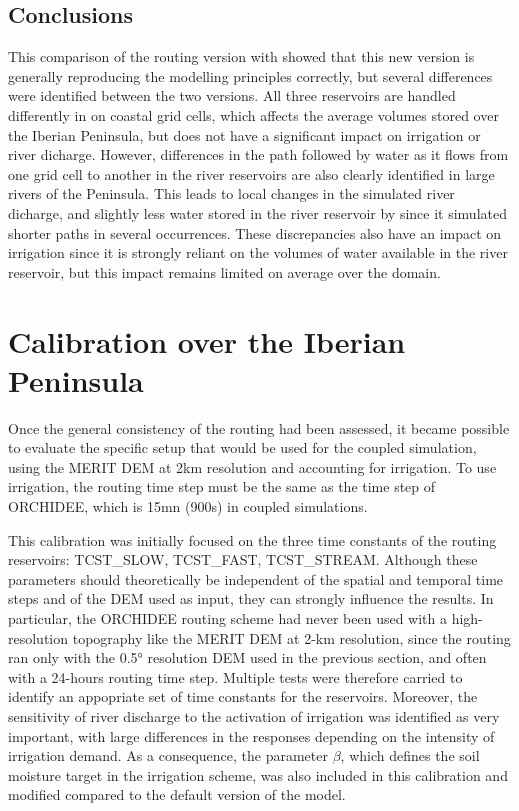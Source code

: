 \subsection{Conclusions}

This comparison of the \native routing version with \std showed that this new version is generally reproducing the modelling principles correctly, but several differences were identified between the two versions. All three reservoirs are handled differently in \native on coastal grid cells, which affects the average volumes stored over the Iberian Peninsula, but does not have a significant impact on irrigation or river dicharge. However, differences in the path followed by water as it flows from one grid cell to another in the river reservoirs are also clearly identified in large rivers of the Peninsula. This leads to local changes in the simulated river dicharge, and slightly less water stored in the river reservoir by \native since it simulated shorter paths in several occurrences. These discrepancies also have an impact on irrigation since it is strongly reliant on the volumes of water available in the river reservoir, but this impact remains limited on average over the domain.

\section{Calibration over the Iberian Peninsula}
\label{section:calib}

Once the general consistency of the \native routing had been assessed, it became possible to evaluate the specific setup that would be used for the coupled simulation, using the MERIT DEM at 2km resolution and accounting for irrigation. To use irrigation, the routing time step must be the same as the time step of ORCHIDEE, which is 15mn (900s) in coupled simulations. 

This calibration was initially focused on the three time constants of the routing reservoirs: TCST\_SLOW, TCST\_FAST, TCST\_STREAM. Although these parameters should theoretically be independent of the spatial and temporal time steps and of the DEM used as input, they can strongly influence the results. %
In particular, the ORCHIDEE routing scheme had never been used with a high-resolution topography like the MERIT DEM at 2-km resolution, since the \std routing ran only with the 0.5° resolution DEM used in the previous section, and often with a 24-hours routing time step. Multiple tests were therefore carried to identify an appopriate set of time constants for the reservoirs.
Moreover, the sensitivity of river discharge to the activation of irrigation was identified as very important, with large differences in the responses depending on the intensity of irrigation demand. As a consequence, the parameter $\beta$, which defines the soil moisture target in the irrigation scheme, was also included in this calibration and modified compared to the default version of the model.

